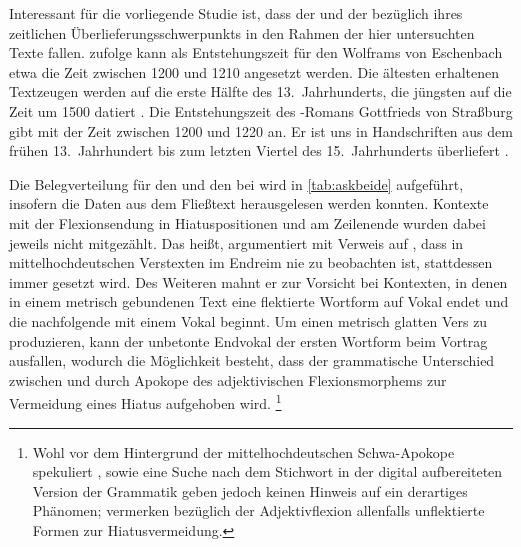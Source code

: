 Interessant für die vorliegende Studie ist, dass der  und der
 bezüglich ihres zeitlichen Überlieferungsschwerpunkts in den
Rahmen der hier untersuchten Texte fallen. \citet[1378]{bumke1999} zufolge kann
als Entstehungszeit für den  Wolframs von Eschenbach etwa die
Zeit zwischen 1200 und 1210 angesetzt werden. Die ältesten erhaltenen
Textzeugen werden auf die erste Hälfte des 13.~Jahrhunderts, die jüngsten auf
die Zeit um 1500 datiert
\autocites[1381]{bumke1999}[vgl.~auch][s.\,v.~\textit{Wolfram von Eschenbach:
}]{hsc}. Die Entstehungszeit des -Romans Gottfrieds
von Straßburg gibt \citet[155]{kuhn1982} mit der
Zeit zwischen 1200 und 1220 an. Er ist uns in Handschriften aus dem frühen
13.~Jahrhundert bis zum letzten Viertel des 15.~Jahrhunderts überliefert
\autocite[vgl.][s.\,v.~\textit{Gottfried von Straßburg: }]{hsc}.

Die Belegverteilung für den  und den  bei
\citet{askedal1973} wird in \cref{tab:askbeide} aufgeführt, insofern die Daten
aus dem Fließtext herausgelesen werden konnten. Kontexte mit der Flexionsendung
in Hiatuspositionen und am Zeilenende wurden dabei jeweils nicht mitgezählt.
Das heißt, \citet[89--91]{askedal1973} argumentiert mit Verweis auf
\citet[662--663]{grimm1870}, dass in mittelhochdeutschen Verstexten im Endreim
nie  zu beobachten ist, stattdessen immer  gesetzt wird. Des
Weiteren mahnt er zur Vorsicht bei Kontexten, in denen in einem metrisch
gebundenen Text eine flektierte Wortform auf Vokal endet und die nachfolgende
mit einem Vokal beginnt. Um einen metrisch glatten Vers zu produzieren, kann
der unbetonte Endvokal der ersten Wortform beim Vortrag ausfallen, wodurch die
Möglichkeit besteht, dass der grammatische Unterschied zwischen  und
 durch Apokope des adjektivischen Flexionsmorphems zur Vermeidung
eines Hiatus aufgehoben wird.%
%
	\footnote{Wohl vor dem Hintergrund der mittelhochdeutschen Schwa-Apokope
		\autocites{lindgren1953}[109--111]{paul2007} spekuliert
		\citet[91]{askedal1973},  \citet[27, 109--111,
		203]{paul2007} sowie eine Suche nach dem Stichwort  in der
		digital aufbereiteten Version der Grammatik geben jedoch keinen Hinweis
		auf ein derartiges Phänomen; \citet[244]{ksw2} vermerken bezüglich der
		Adjektivflexion allenfalls unflektierte Formen zur Hiatusvermeidung.
		}
		
